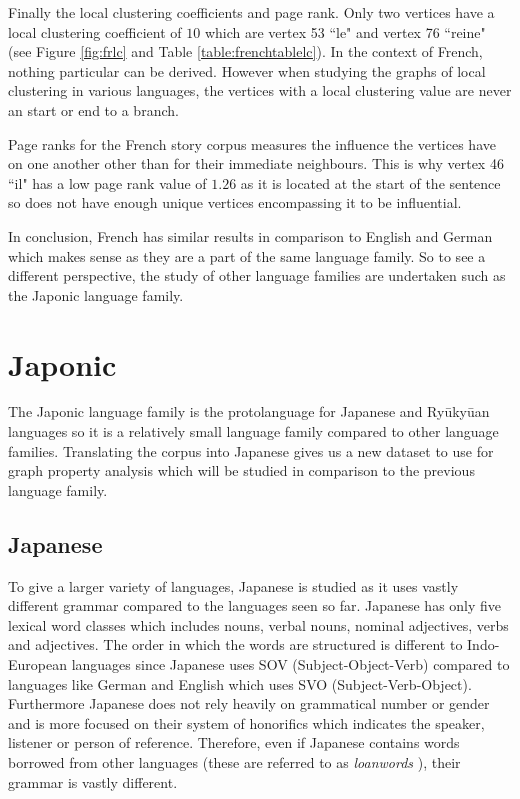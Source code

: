 Finally the local clustering coefficients and page rank. Only two vertices have a local clustering coefficient of $10$ which are vertex 53 ``le" and vertex 76 ``reine" (see Figure \ref{fig:frlc} and Table \ref{table:frenchtablelc}). In the context of French, nothing particular can be derived. However when studying the graphs of local clustering in various languages, the vertices with a local clustering value are never an start or end to a branch.

Page ranks for the French story corpus measures the influence the vertices have on one another other than for their immediate neighbours. This is why vertex 46 ``il" has a low page rank value of $1.26$ as it is located at the start of the sentence so does not have enough unique vertices encompassing it to be influential.

In conclusion, French has similar results in comparison to English and German which makes sense as they are a part of the same language family. So to see a different perspective, the study of other language families are undertaken such as the Japonic language family.

\section{Japonic}
The Japonic language family is the protolanguage for Japanese and Ryūkyūan languages \cite{vovin2017origins} so it is a relatively small language family compared to other language families. Translating the corpus into Japanese gives us a new dataset to use for graph property analysis which will be studied in comparison to the previous language family.
\subsection{Japanese}
To give a larger variety of languages, Japanese is studied as it uses vastly different grammar compared to the languages seen so far. Japanese has only five lexical word classes which includes nouns, verbal nouns, nominal adjectives, verbs and adjectives. The order in which the words are structured is different to Indo-European languages since Japanese uses SOV (Subject-Object-Verb) compared to languages like German and English which uses SVO (Subject-Verb-Object). Furthermore Japanese does not rely heavily on grammatical number or gender and is more focused on their system of honorifics which indicates the speaker, listener or person of reference. Therefore, even if Japanese contains words borrowed from other languages (these are referred to as \emph{loanwords} \cite{miura1979influence}), their grammar is vastly different. 

